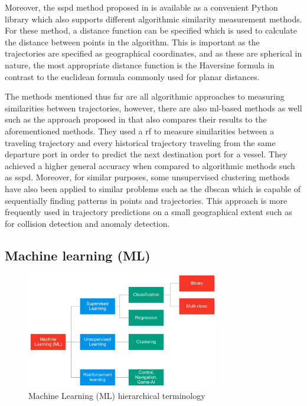 Moreover, the \acrshort{sspd} method proposed in \cite{besse2015review} is available as a convenient Python library which also supports different algorithmic similarity measurement methods. For these method, a distance function can be specified which is used to calculate the distance between points in the algorithm. This is important as the trajectories are specified as geographical coordinates, and as these are spherical in nature, the most appropriate distance function is the Haversine \parencite{haversine} formula in contrast to the euclidean formula commonly used for planar distances.

The methods mentioned thus far are all algorithmic approaches to measuring similarities between trajectories, however, there are also \acrshort{ml}-based methods as well such as the approach proposed in \cite{Zhang2020AISApproach} that also compares their results to the aforementioned methods. They used a \acrfull{rf} to measure similarities between a traveling trajectory and every historical trajectory traveling from the same departure port in order to predict the next destination port for a vessel. They achieved a higher general accuracy when compared to algorithmic methods such as \acrshort{sspd}. Moreover, for similar purposes, some unsupervised clustering methods have also been applied to similar problems such as the \acrfull{dbscan} which is capable of sequentially finding patterns in points and trajectories. This approach is more frequently used in trajectory predictions on a small geographical extent such as for collision detection and anomaly detection.

\subsection{Machine learning (ML)}
\label{sec:machine_learning}

\begin{figure}[htbp]  %
    \centering
    \includegraphics[width=0.75\textwidth]{figures/ml-terms}
    \caption{Machine Learning (ML) hierarchical terminology}
    \label{fig:ml_terms}
\end{figure}

